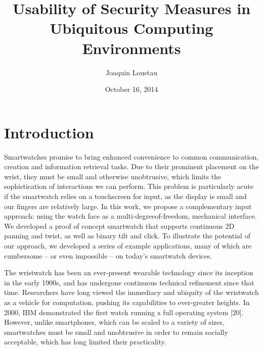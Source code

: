 \documentclass{article}
\title{Usability of Security Measures in Ubiquitous Computing Environments}
\author{Joaquin Loustau}
\date{October 16, 2014}
\begin{document}
\maketitle


\pagebreak
\tableofcontents

\pagebreak

%
%
\section{Introduction}
\label{introduction}
Smartwatches promise to bring enhanced convenience to
common communication, creation and information retrieval
tasks. Due to their prominent placement on the wrist, they
must be small and otherwise unobtrusive, which limits the
sophistication of interactions we can perform. This problem
is particularly acute if the smartwatch relies on a
touchscreen for input, as the display is small and our fingers
are relatively large. In this work, we propose a complementary
input approach: using the watch face as a multi-degreeof-freedom,
mechanical interface. We developed a proof of
concept smartwatch that supports continuous 2D panning
and twist, as well as binary tilt and click. To illustrate the
potential of our approach, we developed a series of example
applications, many of which are cumbersome – or even impossible
– on today’s smartwatch devices.

The wristwatch has been an ever-present wearable technology
since its inception in the early 1900s, and has undergone
continuous technical refinement since that time. Researchers
have long viewed the immediacy and ubiquity of
the wristwatch as a vehicle for computation, pushing its capabilities
to ever-greater heights. In 2000, IBM demonstrated
the first watch running a full operating system [20].
However, unlike smartphones, which can be scaled to a variety
of sizes, smartwatches must be small and unobtrusive
in order to remain socially acceptable, which has long limited
their practicality.
\end{document}
